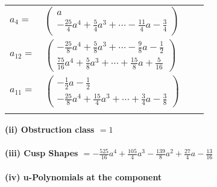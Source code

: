\documentclass[1p]{elsarticle_modified}
\theoremstyle{definition}
\begin{document}
\begin{tabular}{m{7pt} m{180pt} m{7pt} m{180pt} }
\flushright $a_{4}=$&$\begin{pmatrix}a\\-\frac{25}{4} a^4+\frac{5}{4} a^3+\cdots-\frac{11}{4} a-\frac{3}{4}\end{pmatrix}$ \\
\flushright $a_{12}=$&$\begin{pmatrix}-\frac{25}{8} a^4+\frac{5}{8} a^3+\cdots-\frac{9}{8} a-\frac{1}{2}\\\frac{75}{16} a^4+\frac{5}{8} a^3+\cdots+\frac{15}{8} a+\frac{5}{16}\end{pmatrix}$ \\
\flushright $a_{11}=$&$\begin{pmatrix}-\frac{1}{2} a-\frac{1}{2}\\-\frac{25}{8} a^4+\frac{15}{4} a^3+\cdots+\frac{3}{4} a-\frac{3}{8}\end{pmatrix}$\\&\end{tabular}
\flushleft \textbf{(ii) Obstruction class $= 1$}\\~\\
\flushleft \textbf{(iii) Cusp Shapes $= -\frac{525}{16} a^4+\frac{105}{4} a^3-\frac{139}{8} a^2+\frac{27}{4} a-\frac{13}{16}$}\\~\\
\newpage\renewcommand{\arraystretch}{1}
\flushleft \textbf{(iv) u-Polynomials at the component}\newline \\
\end{document}
